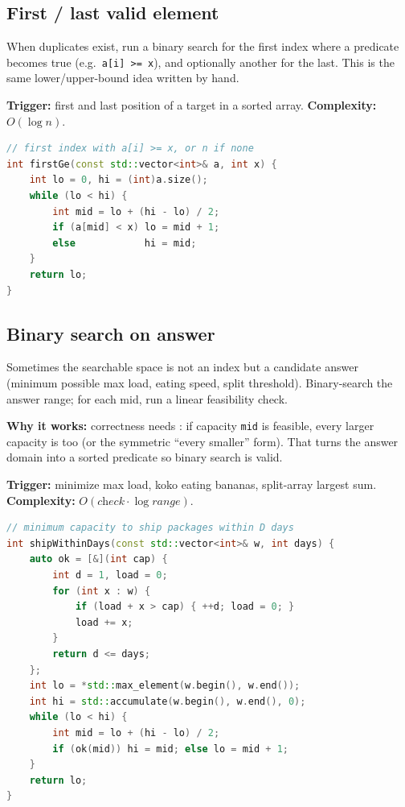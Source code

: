\subsection{First / last valid element}
\label{subsec:pat-bs-first-last}
When duplicates exist, run a binary search for the first index where a predicate
becomes true (e.g.\ \texttt{a[i] >= x}), and optionally another for the last.
This is the same lower/upper-bound idea written by hand.

\textbf{Trigger:} first and last position of a target in a sorted array.
\newline
\textbf{Complexity:} $O(\log n)$.

\begin{lstlisting}[language=C++]
// first index with a[i] >= x, or n if none
int firstGe(const std::vector<int>& a, int x) {
    int lo = 0, hi = (int)a.size();
    while (lo < hi) {
        int mid = lo + (hi - lo) / 2;
        if (a[mid] < x) lo = mid + 1;
        else            hi = mid;
    }
    return lo;
}
\end{lstlisting}

\subsection{Binary search on answer}
\label{subsec:pat-bs-answer}
Sometimes the searchable space is not an index but a candidate answer
(minimum possible max load, eating speed, split threshold). Binary-search the
answer range; for each mid, run a linear feasibility check.

\par\noindent\textbf{Why it works:} correctness needs :
if capacity \texttt{mid} is feasible, every larger capacity is too (or the
symmetric ``every smaller'' form). That turns the answer domain into a sorted
predicate so binary search is valid.

\textbf{Trigger:} minimize max load, koko eating bananas, split-array largest sum.
\newline
\textbf{Complexity:} $O(\textit{check}\cdot\log\textit{range})$.

\begin{lstlisting}[language=C++]
// minimum capacity to ship packages within D days
int shipWithinDays(const std::vector<int>& w, int days) {
    auto ok = [&](int cap) {
        int d = 1, load = 0;
        for (int x : w) {
            if (load + x > cap) { ++d; load = 0; }
            load += x;
        }
        return d <= days;
    };
    int lo = *std::max_element(w.begin(), w.end());
    int hi = std::accumulate(w.begin(), w.end(), 0);
    while (lo < hi) {
        int mid = lo + (hi - lo) / 2;
        if (ok(mid)) hi = mid; else lo = mid + 1;
    }
    return lo;
}
\end{lstlisting}

